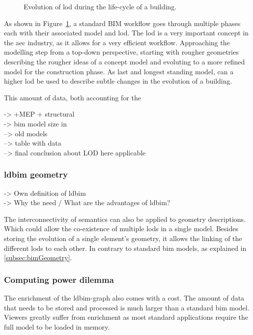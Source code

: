 \begin{figure}[h]
	\centering
	
	\caption{Evolution of \acs{lod} during the life-cycle of a building.}
	\label{fig:bimGraph}
\end{figure}

As shown in Figure~\ref{fig:bimGraph}, a standard BIM workflow goes through multiple phases each with their associated model and \ac{lod}. The \ac{lod} is a very important concept in the \ac{aec} industry, as it allows for a very efficient workflow. Approaching the modelling step from a top-down perspective, starting with rougher geometries describing the rougher ideas of a concept model and evoluting to a more refined model for the construction phase. As last and longest standing model, can a higher \ac{lod} be used to describe subtle changes in the evolution of a building.

This amount of data, both accounting for the

-> +MEP + structural\\
-> bim model size in \cite{Johansson2015}\\
--> old models\\
--> table with data\\
--> final conclusion about LOD here applicable

\subsubsection{\acs{ldbim} geometry}
-> Own definition of \ac{ldbim}\\
-> Why the need / What are the advantages of \ac{ldbim}?

The interconnectivity of semantics can also be applied to geometry descriptions. Which could allow the co-existence of multiple \ac{lod}s in a single model. Besides storing the evolution of a single element's geometry, it allows the linking of the different \ac{lod}s to each other. In contrary to standard \ac{bim} models, as explained in \ref{subsec:bimGeometry}.

\subsubsection{Computing power dilemma} \label{subsec:computingPower}
The enrichment of the \ac{ldbim}-graph also comes with a cost. The amount of data that needs to be stored and processed is much larger than a standard \ac{bim} model. Viewers greatly suffer from enrichment as most standard applications require the full model to be loaded in memory.

